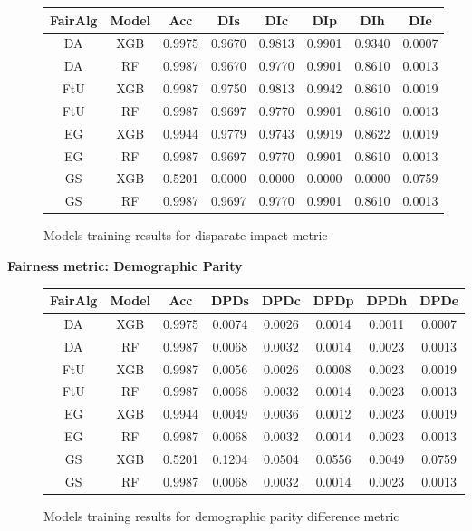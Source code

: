 \begin{figure}[H]
    \centering
    \begin{tabular}{|c|c|c|c|c|c|c|c|}
        \hline
        \textbf{FairAlg} & \textbf{Model} & \textbf{Acc} & \textbf{DIs} & \textbf{DIc} & \textbf{DIp} & \textbf{DIh} & \textbf{DIe} \\
        \hline
        DA & XGB & 0.9975 & 0.9670 & 0.9813 & 0.9901 & 0.9340 & 0.0007 \\
        \hline
        DA & RF & 0.9987 & 0.9670 & 0.9770 & 0.9901 & 0.8610 & 0.0013 \\
        \hline
        FtU & XGB & 0.9987 & 0.9750 & 0.9813 & 0.9942 & 0.8610 & 0.0019 \\
        \hline
        FtU & RF & 0.9987 & 0.9697 & 0.9770 & 0.9901 & 0.8610 & 0.0013 \\
        \hline
        EG & XGB & 0.9944 & 0.9779 & 0.9743 & 0.9919 & 0.8622 & 0.0019 \\
        \hline
        EG & RF & 0.9987 & 0.9697 & 0.9770 & 0.9901 & 0.8610 & 0.0013 \\
        \hline
        GS & XGB & 0.5201 & 0.0000 & 0.0000 & 0.0000 & 0.0000 & 0.0759 \\
        \hline
        GS & RF & 0.9987 & 0.9697 & 0.9770 & 0.9901 & 0.8610 & 0.0013 \\
        \hline
    \end{tabular}
    \caption{Models training results for disparate impact metric}
    \label{fig:results}
\end{figure}
\newpage
\textbf{Fairness metric: Demographic Parity}

\begin{figure}[H]
    \centering
    \begin{tabular}{|c|c|c|c|c|c|c|c|}
        \hline
        \textbf{FairAlg} & \textbf{Model} & \textbf{Acc} & \textbf{DPDs} & \textbf{DPDc} & \textbf{DPDp} & \textbf{DPDh} & \textbf{DPDe} \\
        \hline
        DA & XGB & 0.9975 & 0.0074 & 0.0026 & 0.0014 & 0.0011 & 0.0007\\
        \hline
        DA & RF & 0.9987 & 0.0068 & 0.0032 & 0.0014 & 0.0023 & 0.0013\\
        \hline
        FtU & XGB & 0.9987 & 0.0056 & 0.0026 & 0.0008 & 0.0023 & 0.0019 \\
        \hline
        FtU & RF & 0.9987 & 0.0068 & 0.0032 & 0.0014 & 0.0023 & 0.0013 \\
        \hline
        EG & XGB & 0.9944 & 0.0049 & 0.0036 & 0.0012 & 0.0023 & 0.0019 \\
        \hline
        EG & RF & 0.9987 & 0.0068 & 0.0032 & 0.0014 & 0.0023 & 0.0013 \\
        \hline
        GS & XGB & 0.5201 & 0.1204 & 0.0504 & 0.0556 & 0.0049 & 0.0759 \\
        \hline
        GS & RF & 0.9987 & 0.0068 & 0.0032 & 0.0014 & 0.0023 & 0.0013 \\
        \hline
    \end{tabular}
    \caption{Models training results for demographic parity difference metric}
    \label{fig:results}
\end{figure}
